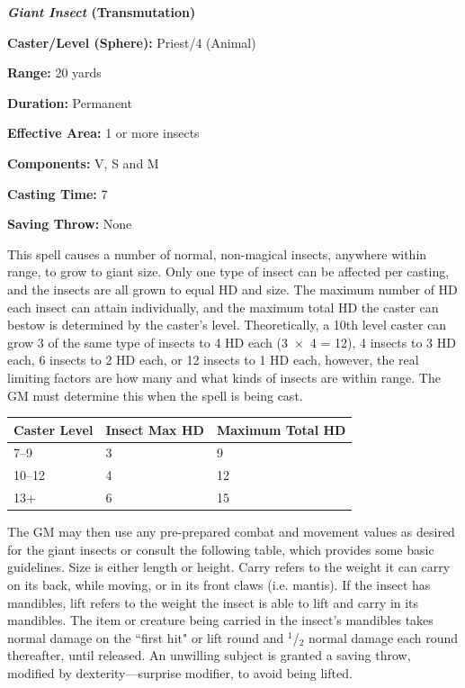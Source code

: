 \begin{multicols}{2}
\vspace{1em}

\noindent
\begin{minipage}{\columnwidth}

\noindent \textbf{\textit{Giant Insect} (Transmutation)}

\noindent \textbf{Caster/Level (Sphere):} Priest/4 (Animal)

\noindent \textbf{Range:} 20 yards

\noindent \textbf{Duration:} Permanent

\noindent \textbf{Effective Area:} 1 or more insects

\noindent \textbf{Components:} V, S and M

\noindent \textbf{Casting Time:} 7

\noindent \textbf{Saving Throw:} None

\end{minipage}

This spell causes a number of normal, non-magical insects, anywhere within range, to grow to giant size.  Only one type of insect can be affected per casting, and the insects are all grown to equal HD and size.  The maximum number of HD each insect can attain individually, and the maximum total HD the caster can bestow is determined by the caster's level.  Theoretically, a 10th level caster can grow 3 of the same type of insects to 4 HD each (3~$\times$~4 = 12), 4 insects to 3 HD each, 6 insects to 2 HD each, or 12 insects to 1 HD each, however, the real limiting factors are how many and what kinds of insects are within range.  The GM must determine this when the spell is being cast. 

\noindent
\begin{tabular}{|p{}|p{}|p{}|}
\hline
Caster Level	& Insect Max HD	& Maximum Total HD \\
\hline\hline
\rowcolor[gray]{.9}7--9	& 3	& 9 \\
10--12	& 4	& 12 \\
\rowcolor[gray]{.9}13+	& 6	& 15 \\
\hline
\end{tabular}

The GM may then use any pre-prepared combat and movement values as desired for the giant insects or consult the following table, which provides some basic guidelines.  Size is either length or height.  Carry refers to the weight it can carry on its back, while moving, or in its front claws (i.e. mantis).  If the insect has mandibles, lift refers to the weight the insect is able to lift and carry in its mandibles.  The item or creature being carried in the insect's mandibles takes normal damage on the ``first hit" or lift round and $^1$/$_2$ normal damage each round thereafter, until released.  An unwilling subject is granted a saving throw, modified by dexterity---surprise modifier, to avoid being lifted.


\end{multicols}
